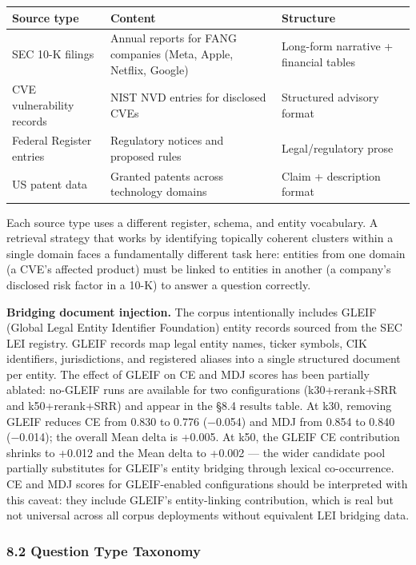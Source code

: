 \begin{small}
\setlength{\tabcolsep}{4pt}
\begin{longtable}{p{1.5in}p{2.5in}p{2.3in}}
\toprule
\textbf{Source type} & \textbf{Content} & \textbf{Structure} \\
\midrule
\endhead
SEC 10-K filings & Annual reports for FANG companies (Meta, Apple, Netflix, Google) & Long-form narrative + financial tables \\
CVE vulnerability records & NIST NVD entries for disclosed CVEs & Structured advisory format \\
Federal Register entries & Regulatory notices and proposed rules & Legal/regulatory prose \\
US patent data & Granted patents across technology domains & Claim + description format \\
\bottomrule
\end{longtable}
\end{small}

Each source type uses a different register, schema, and entity vocabulary. A retrieval strategy that works by identifying topically coherent clusters within a single domain faces a fundamentally different task here: entities from one domain (a CVE's affected product) must be linked to entities in another (a company's disclosed risk factor in a 10-K) to answer a question correctly.

\textbf{Bridging document injection.} The corpus intentionally includes GLEIF (Global Legal Entity Identifier Foundation) entity records sourced from the SEC LEI registry. GLEIF records map legal entity names, ticker symbols, CIK identifiers, jurisdictions, and registered aliases into a single structured document per entity. The effect of GLEIF on CE and MDJ scores has been partially ablated: no-GLEIF runs are available for two configurations (k30+rerank+SRR and k50+rerank+SRR) and appear in the §8.4 results table. At k30, removing GLEIF reduces CE from 0.830 to 0.776 (−0.054) and MDJ from 0.854 to 0.840 (−0.014); the overall Mean delta is +0.005. At k50, the GLEIF CE contribution shrinks to +0.012 and the Mean delta to +0.002 --- the wider candidate pool partially substitutes for GLEIF's entity bridging through lexical co-occurrence. CE and MDJ scores for GLEIF-enabled configurations should be interpreted with this caveat: they include GLEIF's entity-linking contribution, which is real but not universal across all corpus deployments without equivalent LEI bridging data.

\subsubsection{8.2 Question Type Taxonomy}\label{question-type-taxonomy}

